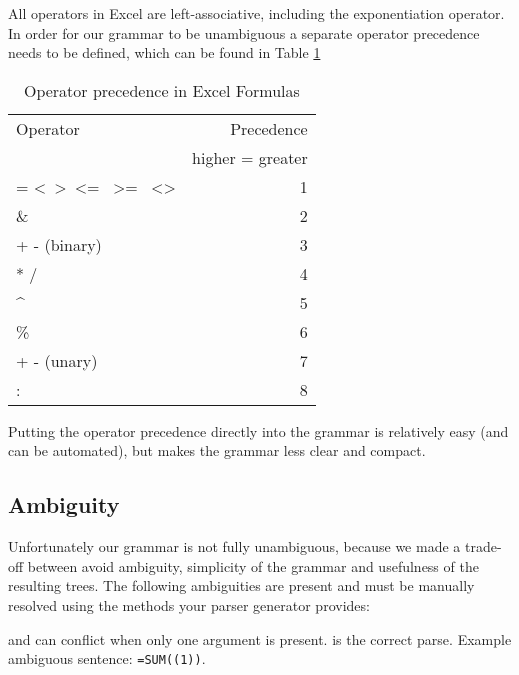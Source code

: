 \documentclass[conference]{IEEEtran}
\begin{document}
All operators in Excel are left-associative, including the exponentiation operator. In order for our grammar to be unambiguous a separate operator precedence needs to be defined, which can be found in Table \ref{table:operatorprec}

\begin{table}
\label{table:operatorprec}
\caption{Operator precedence in Excel Formulas}
\begin{tabular}{lr}
Operator                                                                & Precedence \\
 & higher = greater \\
= \textless \  \textgreater \  \textless= \  \textgreater= \  \textless\textgreater & 1          \\
\&                                                                      & 2          \\
+ - (binary)                                                            & 3          \\
* /                                                                     & 4          \\
\textasciicircum                                                        & 5          \\
\%                                                                      & 6          \\
+ - (unary)                                                             & 7          \\
: \texttt{\char32}                                                             & 8         
\end{tabular}
\end{table}

Putting the operator precedence directly into the grammar is relatively easy (and can be automated), but makes the grammar less clear and compact.

\subsection{Ambiguity}

Unfortunately our grammar is not fully unambiguous, because we made a trade-off between avoid ambiguity, simplicity of the grammar and usefulness of the resulting trees. The following ambiguities are present and must be manually resolved using the methods your parser generator provides:

 and  can conflict when only one argument is present.  is the correct parse. Example ambiguous sentence: \texttt{=SUM((1))}.
\end{document}
